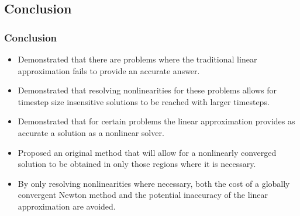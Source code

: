 \documentclass[compress,xcolor=table]{beamer}
\begin{document}
\subsection[Conclusion]{Conclusion}
\begin{frame}
\frametitle{Conclusion}

\begin{itemize}
\item{Demonstrated that there are problems where the traditional linear approximation fails to provide an accurate answer.}
\item{Demonstrated that resolving nonlinearities for these problems allows for timestep size insensitive solutions to be reached with larger timesteps.}
\item{Demonstrated that for certain problems the linear approximation provides as accurate a solution as a nonlinear solver.}
\item{Proposed an original method that will allow for a nonlinearly converged solution to be obtained in only those regions where it is necessary.}
\item{By only resolving nonlinearities where necessary, both the cost of a globally convergent Newton method and the potential inaccuracy of the linear approximation are avoided.}
\end{itemize}

\end{frame}
\end{document}
